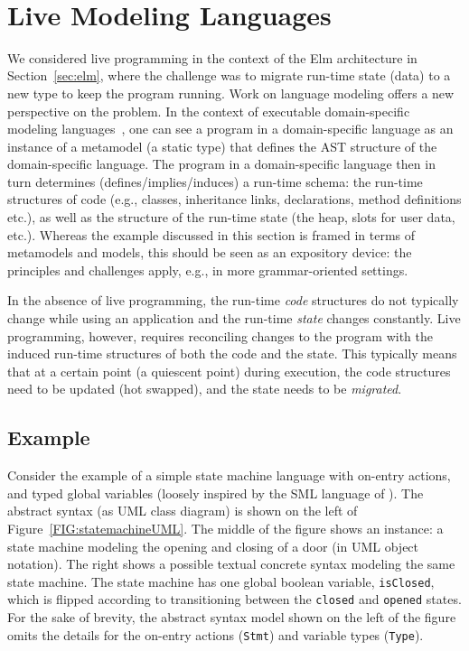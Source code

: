 \documentclass[english,submission]{programming}
\begin{document}
~

\section{Live Modeling Languages}
\label{sec:livemodeling}

We considered live programming in the context of the Elm architecture in Section~\ref{sec:elm},
where the challenge was to migrate run-time state (data) to a new type to keep the program running.
Work on language modeling offers a new perspective on the problem. In the context of executable domain-specific modeling languages~\cite{}, one can see a program in a domain-specific language as an instance of a metamodel (a static type) that
defines the AST structure of the domain-specific language. The program in a domain-specific language
then in turn determines (defines/implies/induces) a run-time schema: the run-time structures
of code (e.g., classes, inheritance links, declarations, method definitions etc.), as well as the structure of the run-time state (the heap, slots for user data, etc.).
Whereas the example discussed in this section is framed in terms of metamodels and models, this should be seen as an expository device: the principles and challenges apply, e.g., in more grammar-oriented settings.

In the absence of live programming, the run-time \emph{code} structures do not typically
change while using an application and the run-time \emph{state} changes constantly.
Live programming, however, requires reconciling changes to the program with the induced run-time structures
of both the code and the state. This typically means that at a certain point (a quiescent point)
during execution, the code structures need to be updated (hot swapped), and the state needs to be \textit{migrated}.

\subsection{Example}
Consider the example of a simple state machine language with on-entry actions, and typed global
variables (loosely inspired by the SML language of \citet{vanRozen19}). 
The abstract syntax (as UML class diagram) is shown on the left of Figure~\ref{FIG:statemachineUML}. 
The middle of the figure shows an instance: a state machine modeling the opening and closing of a door (in UML object notation). 
The right shows a possible textual concrete syntax modeling the same state machine. 
The state machine has one global
boolean variable, \lstinline{isClosed}, which is flipped according to transitioning between the
\lstinline{closed} and \lstinline{opened} states. For the sake of brevity, the abstract syntax
model  shown on the left of the figure
omits the details for the on-entry actions (\lstinline{Stmt}) and variable types (\lstinline{Type}).
\end{document}

